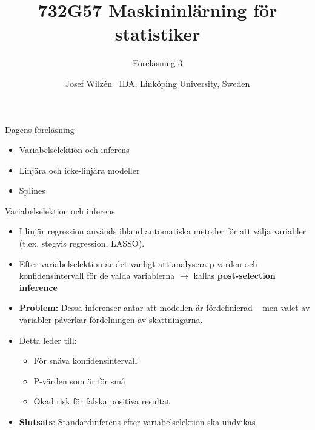 \documentclass[10pt,english]{beamer}
\title{732G57 Maskininlärning för statistiker }
\subtitle{Föreläsning 3}
\date{}
\author{Josef Wilzén \ IDA, Linköping University, Sweden}
\begin{document}
\maketitle

\begin{frame}{Dagens föreläsning}

    \begin{itemize}
        \item Variabelselektion och inferens
        \item Linjära och icke-linjära modeller
        \item Splines
    \end{itemize}
    
\end{frame}


\begin{frame}{Variabelselektion och inferens}
\begin{itemize}
    \item I linjär regression används ibland automatiska metoder för att välja variabler (t.ex. stegvis regression, LASSO).
    \item Efter variabelselektion är det vanligt att analysera p-värden och konfidensintervall för de valda variablerna $\rightarrow$ kallas \textbf{post-selection inference}
    \item \textbf{Problem:} Dessa inferenser antar att modellen är fördefinierad – men valet av variabler påverkar fördelningen av skattningarna.
    \item Detta leder till:
    \begin{itemize}
        \item För snäva konfidensintervall
        \item P-värden som är för små
        \item Ökad risk för falska positiva resultat
    \end{itemize}
    \item \textbf{Slutsats}: Standardinferens efter variabelselektion ska undvikas
\end{itemize}
\end{frame}
\end{document}
